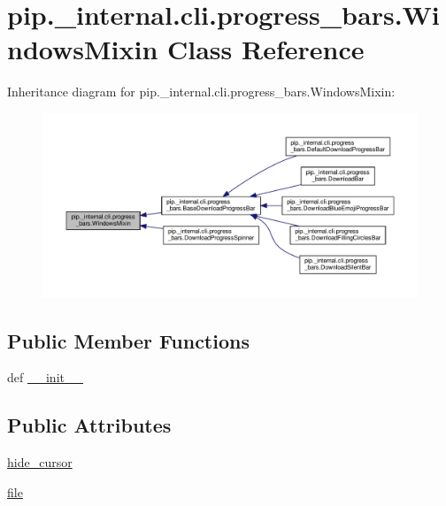 \hypertarget{classpip_1_1__internal_1_1cli_1_1progress__bars_1_1WindowsMixin}{}\section{pip.\+\_\+internal.\+cli.\+progress\+\_\+bars.\+Windows\+Mixin Class Reference}
\label{classpip_1_1__internal_1_1cli_1_1progress__bars_1_1WindowsMixin}


Inheritance diagram for pip.\+\_\+internal.\+cli.\+progress\+\_\+bars.\+Windows\+Mixin\+:
\nopagebreak
\begin{figure}[H]
\begin{center}
\leavevmode
\includegraphics[width=350pt]{classpip_1_1__internal_1_1cli_1_1progress__bars_1_1WindowsMixin__inherit__graph}
\end{center}
\end{figure}
\subsection*{Public Member Functions}
\begin{DoxyCompactItemize}
\item 
def \hyperlink{classpip_1_1__internal_1_1cli_1_1progress__bars_1_1WindowsMixin_a6a4e543fc99c5878a7a6b97a48c62668}{\+\_\+\+\_\+init\+\_\+\+\_\+}
\end{DoxyCompactItemize}
\subsection*{Public Attributes}
\begin{DoxyCompactItemize}
\item 
\hyperlink{classpip_1_1__internal_1_1cli_1_1progress__bars_1_1WindowsMixin_aa8d1662089c97d0390cbb76eb9f9bcfc}{hide\+\_\+cursor}
\item 
\hyperlink{classpip_1_1__internal_1_1cli_1_1progress__bars_1_1WindowsMixin_a353f059e8bd30842e8f85f628ac64e13}{file}
\end{DoxyCompactItemize}


